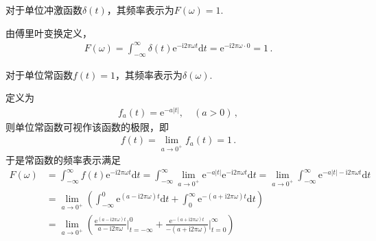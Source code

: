 \begin{theorem}\label{theorem:7.ex01.2}
    对于单位冲激函数$\delta(t)$，其频率表示为$F(\omega)=1$.
\end{theorem}
\begin{prove}
    由傅里叶变换定义，
    \begin{align}
        F(\omega)=\int_{-\infty}^{\infty}\delta(t)\mathrm{e}^{-\mathrm{i}2\pi\omega t}\mathrm{d}t
        =\mathrm{e}^{-\mathrm{i}2\pi\omega\cdot0}
        =1\, .
    \end{align}
\end{prove}

\begin{theorem}\label{theorem:7.ex01.3}
    对于单位常函数$f(t)=1$，其频率表示为$\delta(\omega)$.
\end{theorem}
\begin{prove}
    定义为
    \begin{align}
        f_a(t)=\mathrm{e}^{-a|t|},\quad (a>0)\, ,
    \end{align}
    则单位常函数可视作该函数的极限，即
    \begin{align}
        f(t)=\lim\limits_{a\rightarrow0^+}f_a(t)=1\, .
    \end{align}
    于是常函数的频率表示满足
    \begin{align}
        F(\omega) & =\int_{-\infty}^{\infty}f(t)\mathrm{e}^{-\mathrm{i}2\pi\omega t}\mathrm{d}t
        =\int_{-\infty}^{\infty}\lim\limits_{a\rightarrow0^+}\mathrm{e}^{-a|t|}\mathrm{e}^{-\mathrm{i}2\pi\omega t}\mathrm{d}t
        =\lim\limits_{a\rightarrow0^+}\int_{-\infty}^{\infty}\mathrm{e}^{-a|t|-\mathrm{i}2\pi\omega t}\mathrm{d}t\nonumber                                                                                  \\
                  & =\lim\limits_{a\rightarrow0^+}\left(\int_{-\infty}^0\mathrm{e}^{(a-\mathrm{i}2\pi\omega)t}\mathrm{d}t+\int_0^{\infty}\mathrm{e}^{-(a+\mathrm{i}2\pi\omega)t}\mathrm{d}t\right)\nonumber \\
                  & =\lim\limits_{a\rightarrow0^+}\left(\frac{\mathrm{e}^{(a-\mathrm{i}2\pi\omega)t}}{a-\mathrm{i}2\pi\omega}\bigg|_{t=-\infty}^0
        +\frac{\mathrm{e}^{-(a+\mathrm{i}2\pi\omega)t}}{-(a+\mathrm{i}2\pi\omega)}\bigg|_{t=0}^{\infty}\right)\nonumber                                                                                     \\

\end{align}
\end{prove}
